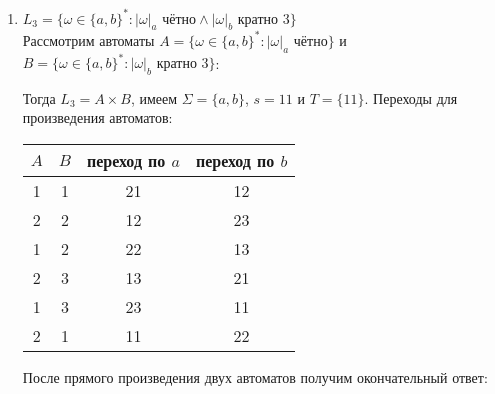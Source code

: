 \documentclass{article}
\begin{document}
\begin{enumerate}
        \item \(L_3=\{\omega \in\{a,b\}^* : |\omega|_a \text{ чётно} \wedge |\omega|_b \text{ кратно } 3 \} \) \\
        Рассмотрим автоматы \(A=\{\omega \in\{a,b\}^* : |\omega|_a \text{ чётно} \} \) и \(B=\{\omega \in\{a,b\}^* : |\omega|_b \text{ кратно } 3 \} \):
        \begin{center}
        \end{center}
        Тогда \(L_3=A \times B\), имеем \(\Sigma=\{a,b\}\), \(s=11\) и \(T=\{11\}\). Переходы для произведения автоматов:
        \begin{center}
            \begin{tabular}{ |c|c|c|c| } 
                \hline
                \(A\) & \(B\) & переход по \(a\) & переход по \(b\) \\
                \hline\hline
                1 & 1 & 21 & 12 \\
                \hline
                2 & 2 & 12 & 23 \\
                \hline
                1 & 2 & 22 & 13 \\
                \hline
                2 & 3 & 13 & 21 \\
                \hline
                1 & 3 & 23 & 11 \\
                \hline
                2 & 1 & 11 & 22 \\
                \hline
            \end{tabular}
        \end{center}
        После прямого произведения двух автоматов получим окончательный ответ:
        \begin{center}
\end{center}
\end{enumerate}
\end{document}
